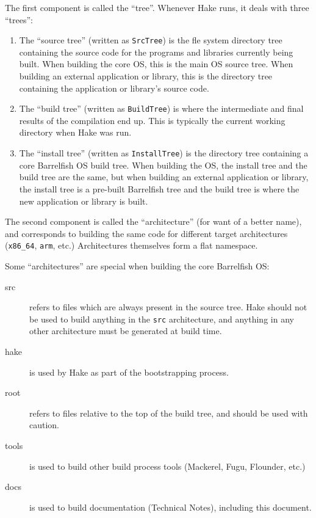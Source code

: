 \documentclass[a4paper,twoside]{report} %
\begin{document}
The first component is called the ``tree''.  Whenever Hake runs, it
deals with three ``trees'':
\begin{enumerate}

\item The ``source tree'' (written as \texttt{SrcTree}) is the fle
  system directory tree containing the source code for the programs
  and libraries currently being built.  When building the core OS,
  this is the main OS source tree. When building an external
  application or library, this is the directory tree containing the
  application or library's source code.

\item The ``build tree'' (written as \texttt{BuildTree}) is where the
  intermediate and final results of the compilation end up.  This is
  typically the current working directory when Hake was run.

\item The ``install tree'' (written as \texttt{InstallTree}) is the
  directory tree containing a core Barrelfish OS build tree.  When
  building the OS, the install tree and the build tree are the same,
  but when building an external application or library, the install
  tree is a pre-built Barrelfish tree and the build tree is where the
  new application or library is built.
\end{enumerate}

The second component is called the ``architecture'' (for want
of a better name), and corresponds to building the same code for
different target architectures (\texttt{x86\_64}, \texttt{arm}, etc.)
Architectures themselves form a flat namespace.

Some ``architectures'' are special when building the core Barrelfish OS:
\begin{description}
\item[src] refers to files which are always present in the source
tree.  Hake should not be used to build anything in the \texttt{src}
architecture, and anything in any other architecture must be generated
at build time.
\item[hake] is used by Hake as part of the bootstrapping process.
\item[root] refers to files relative to the top of the build
tree, and should be used with caution.
\item[tools] is used to build other build process tools (Mackerel,
  Fugu, Flounder, etc.)
\item[docs] is used to build documentation (Technical Notes),
  including this document.
\end{description}
\end{document}
